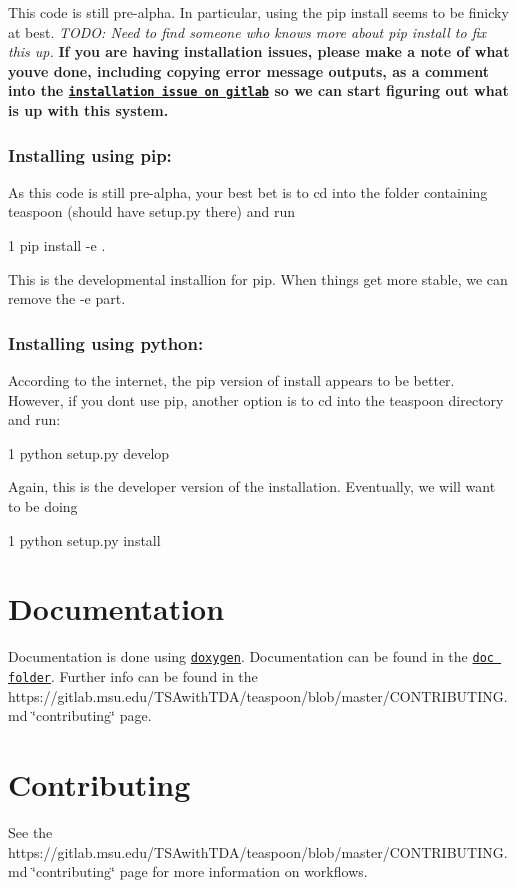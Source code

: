 This code is still pre-\/alpha. In particular, using the pip install seems to be finicky at best. {\itshape T\+O\+DO\+: Need to find someone who knows more about pip install to fix this up.} {\bfseries If you are having installation issues, please make a note of what you\textquotesingle{}ve done, including copying error message outputs, as a comment into the \href{https://gitlab.msu.edu/TSAwithTDA/teaspoon/issues/1}{\tt installation issue on gitlab} so we can start figuring out what is up with this system.}

\subsubsection*{Installing using pip\+:}

As this code is still pre-\/alpha, your best bet is to cd into the folder containing teaspoon (should have setup.\+py there) and run


\begin{DoxyCode}
1 pip install -e .
\end{DoxyCode}


This is the developmental installion for pip. When things get more stable, we can remove the -\/e part.

\subsubsection*{Installing using python\+:}

According to the internet, the pip version of install appears to be better. However, if you don\textquotesingle{}t use pip, another option is to cd into the teaspoon directory and run\+:


\begin{DoxyCode}
1 python setup.py develop
\end{DoxyCode}


Again, this is the developer version of the installation. Eventually, we will want to be doing


\begin{DoxyCode}
1 python setup.py install
\end{DoxyCode}


\section*{Documentation }

Documentation is done using \href{http://www.doxygen.org}{\tt doxygen}. Documentation can be found in the \href{https://gitlab.msu.edu/TSAwithTDA/teaspoon/doc/html/index.html}{\tt doc folder}. Further info can be found in the https\+://gitlab.msu.\+edu/\+T\+S\+Awith\+T\+D\+A/teaspoon/blob/master/\+C\+O\+N\+T\+R\+I\+B\+U\+T\+I\+NG.md \char`\"{}contributing\char`\"{} page.

\section*{Contributing }

See the https\+://gitlab.msu.\+edu/\+T\+S\+Awith\+T\+D\+A/teaspoon/blob/master/\+C\+O\+N\+T\+R\+I\+B\+U\+T\+I\+NG.md \char`\"{}contributing\char`\"{} page for more information on workflows. 